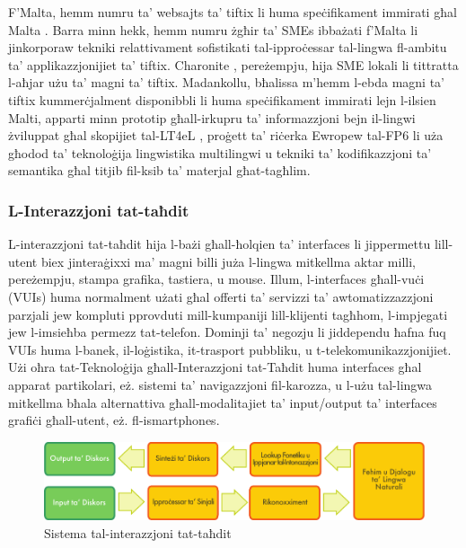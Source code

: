 \documentclass[]{../../metanetpaper}
\begin{document}
\begin{multicols}{2}
F'Malta, hemm numru ta’ websajts ta’ tiftix li huma speċifikament immirati għal Malta \cite{philb1}. Barra minn hekk, hemm numru żgħir ta’ SMEs ibbażati f’Malta li jinkorporaw tekniki relattivament sofistikati tal-ipproċessar tal-lingwa fl-ambitu ta’ applikazzjonijiet ta’ tiftix. Charonite \cite{charonite1}, pereżempju, hija SME lokali li tittratta l-aħjar użu ta’ magni ta’ tiftix. Madankollu, bħalissa m’hemm l-ebda magni ta’ tiftix kummerċjalment disponibbli li huma speċifikament immirati lejn l-ilsien Malti, apparti minn prototip għall-irkupru ta’ informazzjoni bejn il-lingwi żviluppat għal skopijiet tal-LT4eL \cite{let1}, proġett ta’ riċerka Ewropew tal-FP6 li uża għodod ta’ teknoloġija lingwistika multilingwi u tekniki ta’ kodifikazzjoni ta’ semantika għal titjib fil-ksib ta’ materjal għat-tagħlim.
  
\subsubsection{L-Interazzjoni tat-taħdit }

L-interazzjoni tat-taħdit hija l-bażi għall-ħolqien ta’ interfaces li jippermettu lill-utent biex jinteraġixxi ma’ magni billi juża l-lingwa mitkellma aktar milli, pereżempju, stampa grafika, tastiera, u mouse. Illum, l-interfaces għall-vuċi (VUIs) huma normalment użati għal offerti ta’ servizzi ta’ awtomatizzazzjoni parzjali jew kompluti pprovduti mill-kumpaniji lill-klijenti tagħhom, l-impjegati jew l-imsieħba permezz tat-telefon. Dominji ta’ negozju li jiddependu ħafna fuq VUIs huma l-banek, il-loġistika, it-trasport pubbliku, u t-telekomunikazzjonijiet. Użi oħra tat-Teknoloġija għall-Interazzjoni tat-Taħdit huma interfaces għal apparat partikolari, eż. sistemi ta’ navigazzjoni fil-karozza, u l-użu tal-lingwa mitkellma bħala alternattiva għall-modalitajiet ta’ input/output ta’ interfaces grafiċi għall-utent, eż. fl-ismartphones.


\begin{figure}[htb]
  \center 
  \includegraphics[width=\textwidth]{../_media/maltese/simple_speech-based_dialogue_architecture}
  \caption{Sistema tal-interazzjoni tat-taħdit}
  \label{fig:dialoguearch_mt}
\end{figure}


\end{multicols}
\end{document}
